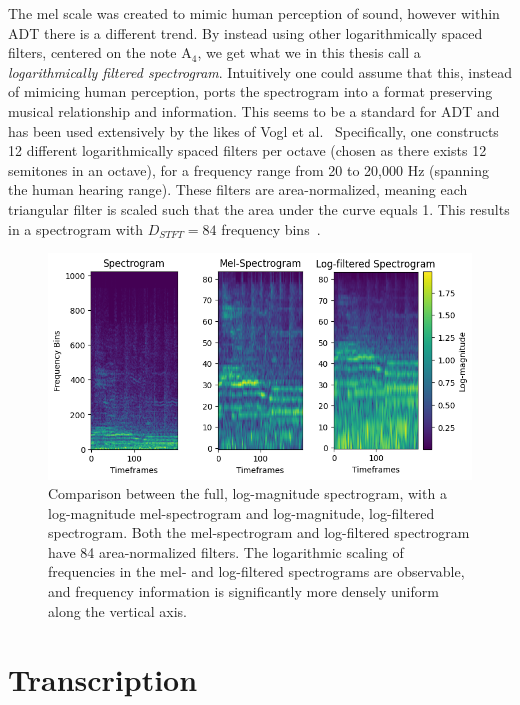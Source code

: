 The mel scale was created to mimic human perception of sound, however within \gls{ADT} there is a different trend. By instead using other logarithmically spaced filters, centered on the note $\text{A}_4$, we get what we in this thesis call a \textit{logarithmically filtered spectrogram}. Intuitively one could assume that this, instead of mimicing human perception, ports the spectrogram into a format preserving musical relationship and information. This seems to be a standard for \gls{ADT} and has been used extensively by the likes of Vogl et al.~\cite{Vogl2017DrumTV, vogl2018multiinstrumentdrumtranscription} Specifically, one constructs 12 different logarithmically spaced filters per octave (chosen as there exists 12 semitones in an octave), for a frequency range from 20 to 20,000 Hz (spanning the human hearing range). These filters are area-normalized, meaning each triangular filter is scaled such that the area under the curve equals 1. This results in a spectrogram with $D_{STFT} = 84$ frequency bins~\cite{8350302, signals4040042}.

\begin{figure}[H]
    \centering
    \hspace*{-0.6cm}
    \includegraphics[scale=0.9]{figures/allspectrograms}
    \caption{Comparison between the full, log-magnitude spectrogram, with a log-magnitude mel-spectrogram and log-magnitude, log-filtered spectrogram. Both the mel-spectrogram and log-filtered spectrogram have 84 area-normalized filters. The logarithmic scaling of frequencies in the mel- and log-filtered spectrograms are observable, and frequency information is significantly more densely uniform along the vertical axis.}
    \label{AllSpectrogramFigure}
\end{figure}

\section{Transcription}

